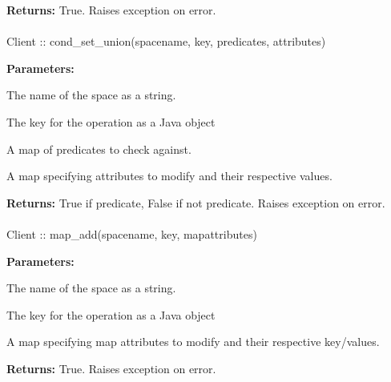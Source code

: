 \noindent\textbf{Returns:}
True.  Raises exception on error.

\paragraph{}
\label{api:java:cond_set_union}
\begin{javacode}
Client :: cond_set_union(spacename, key, predicates, attributes)
\end{javacode}
\funcdesc 

\noindent\textbf{Parameters:}
\begin{description}[labelindent=\widthof{{\code{predicates}}},leftmargin=*,noitemsep,nolistsep,align=right]
\item[\code{spacename}] The name of the space as a string.
\item[\code{key}] The key for the operation as a Java object
\item[\code{predicates}] A map of predicates to check against.
\item[\code{attributes}] A map specifying attributes to modify and their respective values.
\end{description}

\noindent\textbf{Returns:}
True if predicate, False if not predicate.  Raises exception on error.

\paragraph{}
\label{api:java:map_add}
\begin{javacode}
Client :: map_add(spacename, key, mapattributes)
\end{javacode}
\funcdesc 

\noindent\textbf{Parameters:}
\begin{description}[labelindent=\widthof{{\code{mapattributes}}},leftmargin=*,noitemsep,nolistsep,align=right]
\item[\code{spacename}] The name of the space as a string.
\item[\code{key}] The key for the operation as a Java object
\item[\code{mapattributes}] A map specifying map attributes to modify and their respective key/values.
\end{description}

\noindent\textbf{Returns:}
True.  Raises exception on error.

